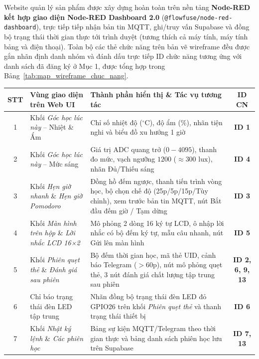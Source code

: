 Website quản lý sản phẩm được xây dựng hoàn toàn trên nền tảng \textbf{Node-RED kết hợp giao diện Node-RED Dashboard 2.0} (\texttt{@flowfuse/node-red-dashboard}), trực tiếp tiếp nhận bản tin MQTT, ghi/truy vấn Supabase và đồng bộ trạng thái thời gian thực tới trình duyệt (tương thích cả máy tính, máy tính bảng và điện thoại). Toàn bộ các thẻ chức năng trên bản vẽ wireframe đều được gắn nhãn định danh nhóm và đánh dấu trực tiếp ID chức năng tương ứng với danh sách đã đăng ký ở Mục 1, được tổng hợp trong Bảng~\ref{tab:map_wireframe_chuc_nang}.

\begin{table}[H]
\centering
\setlength{\tabcolsep}{5pt}
\begin{tabularx}{\textwidth}{|c|>{\raggedright\arraybackslash}p{4.3cm}|>{\raggedright\arraybackslash}X|c|}
\hline
\textbf{STT} & \textbf{Vùng giao diện trên Web UI} & \textbf{Thành phần hiển thị \& Tác vụ tương tác} & \textbf{ID CN} \\ \hline
1 & Khối \textit{Góc học lúc này} -- Nhiệt \& Ẩm & Chỉ số nhiệt độ ($^\circ\text{C}$), độ ẩm (\%), nhãn tiện nghi và biểu đồ xu hướng 1 giờ & \textbf{ID 1} \\ \hline
2 & Khối \textit{Góc học lúc này} -- Mức sáng & Giá trị ADC quang trở ($0 - 4095$), thanh đo mức, vạch ngưỡng $1200$ ($\approx 300\text{ lux}$), nhãn Đủ/Thiếu sáng & \textbf{ID 4} \\ \hline
3 & Khối \textit{Hẹn giờ nhanh} \& \textit{Hẹn giờ Pomodoro} & Đồng hồ đếm ngược, thanh tiến trình vòng học, bộ chọn chế độ (25p/5p/15p/Tùy chỉnh), xem trước bản tin MQTT, nút Bắt đầu đếm giờ / Tạm dừng & \textbf{ID 3} \\ \hline
4 & Khối \textit{Màn hình trên hộp} \& \textit{Lời nhắc LCD 16×2} & Mô phỏng 2 dòng 16 ký tự LCD, ô nhập lời nhắc có bộ đếm ký tự, mẫu câu nhanh, nút Gửi lên màn hình & \textbf{ID 5} \\ \hline
5 & Khối \textit{Phiên quẹt thẻ} \& \textit{Đánh giá sau phiên} & Bộ đếm thời gian học, mã thẻ UID, cảnh báo Telegram ($>60$p), nút mô phỏng quẹt thẻ, 3 nút đánh giá chất lượng tập trung sau phiên & \textbf{ID 2, 6, 9, 13} \\ \hline
6 & Chỉ báo trạng thái đèn LED tập trung & Nhãn đồng bộ trạng thái đèn LED đỏ GPIO26 trên khối \textit{Phiên quẹt thẻ} và thanh trạng thái thiết bị & \textbf{ID 6} \\ \hline
7 & Khối \textit{Nhật ký lệnh} \& \textit{Các phiên học} & Bảng sự kiện MQTT/Telegram theo thời gian thực và bảng danh sách phiên học lưu trên Supabase & \textbf{ID 7, 13} \\ \hline

\end{tabularx}
\end{table}
